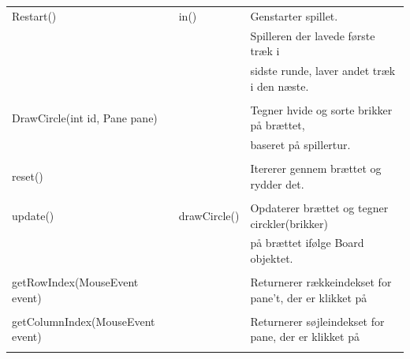 \begin{table}[H]
\begin{tabular}{lll}
                            Restart() & in() & Genstarter spillet. \\
                         &         &        Spilleren der lavede første træk i \\      &         & sidste runde, laver andet træk i den næste.\\
                         \\
                         DrawCircle(int id, Pane pane) & & Tegner hvide og sorte brikker på brættet, \\
                         & & baseret på spillertur.
                         \\
                         \\
                          reset()                              &                 & Itererer gennem brættet og rydder det.                       \\
                                             &                 &                                                           \\
        update()                             & drawCircle()    & Opdaterer brættet og tegner circkler(brikker)              \\
                                             &                 & på brættet ifølge Board objektet.                          \\
                                             \\
         getRowIndex(MouseEvent event)        &                 & Returnerer rækkeindekset for pane't, der er klikket på      \\
                                             &                 &                                                           \\
        getColumnIndex(MouseEvent event)     &                 & Returnerer søjleindekset for pane, der er klikket på      \\
                                             &                 &                                                           \\
 \bottomrule
    \end{tabular}
\end{table}

